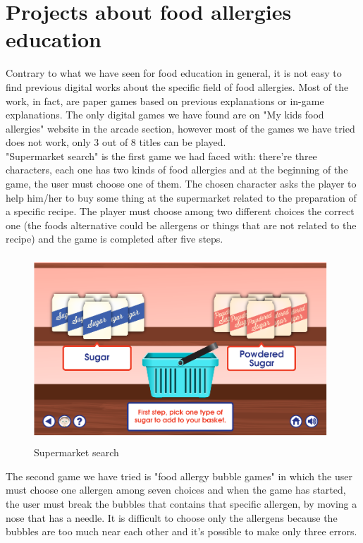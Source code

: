 \section{Projects about food allergies education}
Contrary to what we have seen for food education in general, it is not easy to find previous digital works about the specific field of food allergies. Most of the work, in fact, are paper games based on previous explanations or in-game explanations. The only digital games we have found are on "My kids food allergies" website \cite{Mykids} in the arcade section, however most of the games we have tried does not work, only 3 out of 8 titles can be played.\\
"Supermarket search" is the first game we had faced with: there're three characters, each one has two kinds of food allergies and at the beginning of the game, the user must choose one of them. The chosen character asks the player to help him/her to buy some thing at the supermarket related to the preparation of a specific recipe. The player must choose among two different choices the correct one (the foods alternative could be allergens or things that are not related to the recipe) and the game is completed after five steps. 
\begin{figure}[H]
\centering
\includegraphics[width=11cm, height=7cm]{immagini/supermarket.png}
\caption{Supermarket search}\label{fig:supermarket}
\end{figure}
The second game we have tried is "food allergy bubble games" in which the user must choose one allergen among seven choices and when the game has started, the user must break the bubbles that contains that specific allergen, by moving a nose that has a needle. It is difficult to choose only the allergens because the bubbles are too much near each other and it's possible to make only three errors.
